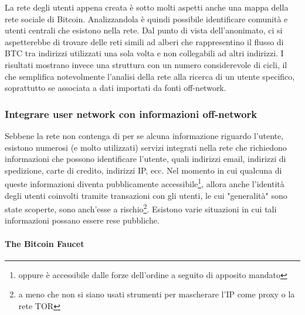 La rete degli utenti appena creata è sotto molti aspetti anche una mappa della rete sociale di Bitcoin. Analizzandola è quindi possibile identificare comunità e utenti centrali che esistono nella rete.
Dal punto di vista dell'anonimato, ci si aspetterebbe di trovare delle reti simili ad alberi che rappresentino il flusso di BTC tra indirizzi utilizzati una sola volta e non collegabili ad altri indirizzi.
I risultati mostrano invece una struttura con un numero considerevole di cicli, il che semplifica notevolmente l'analisi della rete alla ricerca di un utente specifico, soprattutto se associata a dati importati da fonti off-network.

\subsubsection{Integrare user network con informazioni off-network}

Sebbene la rete non contenga di per se alcuna informazione riguardo l'utente, esistono numerosi (e molto utilizzati) servizi integrati nella rete che richiedono informazioni che possono identificare l'utente, quali indirizzi email, indirizzi di spedizione, carte di credito, indirizzi IP, ecc.
Nel momento in cui qualcuna di queste informazioni diventa pubblicamente accessibile\footnote{oppure è accessibile dalle forze dell'ordine a seguito di apposito mandato}, allora anche l'identità degli utenti coinvolti tramite transazioni con gli utenti, le cui "generalità" sono state scoperte, sono anch'esse a rischio\footnote{a meno che non si siano usati strumenti per mascherare l'IP come proxy o la rete TOR}. Esistono varie situazioni in cui tali informazioni possano essere rese pubbliche.

\paragraph{The Bitcoin Faucet}

